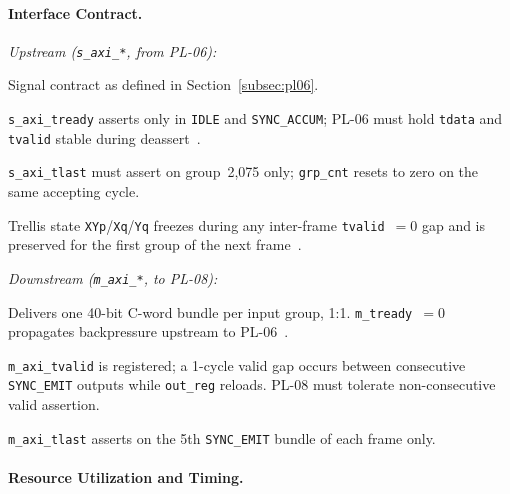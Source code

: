 
\FloatBarrier
\paragraph{Interface Contract.}

\textit{Upstream (\texttt{s\_axi\_*}, from PL-06):}
\begin{tightemize}
  \item Signal contract as defined in Section~\ref{subsec:pl06}.
  \item \texttt{s\_axi\_tready} asserts only in \texttt{IDLE} and
        \texttt{SYNC\_ACCUM}; PL-06 must hold \texttt{tdata} and
        \texttt{tvalid} stable during deassert~\cite{ARM_IHI0022}.
  \item \texttt{s\_axi\_tlast} must assert on group~2{,}075 only;
        \texttt{grp\_cnt} resets to zero on the same accepting cycle.
  \item Trellis state \texttt{XYp}/\texttt{Xq}/\texttt{Yq} freezes
        during any inter-frame \texttt{tvalid}~$= 0$ gap and is
        preserved for the first group of the next frame~\cite{ITU_J83}.
\end{tightemize}

\textit{Downstream (\texttt{m\_axi\_*}, to PL-08):}
\begin{tightemize}
  \item Delivers one 40-bit C-word bundle per input group, 1:1.
        \texttt{m\_tready}~$= 0$ propagates backpressure upstream to
        PL-06~\cite{ARM_IHI0022}.
  \item \texttt{m\_axi\_tvalid} is registered; a 1-cycle valid gap
        occurs between consecutive \texttt{SYNC\_EMIT} outputs while
        \texttt{out\_reg} reloads.
        PL-08 must tolerate non-consecutive valid assertion.
  \item \texttt{m\_axi\_tlast} asserts on the 5th \texttt{SYNC\_EMIT}
        bundle of each frame only.
\end{tightemize}


\FloatBarrier
\paragraph{Resource Utilization and Timing.}
\leavevmode\par


